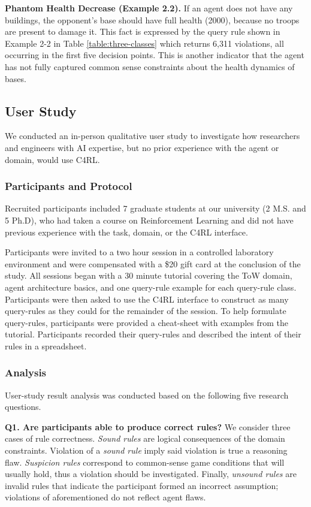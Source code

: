 \documentclass[letterpaper]{article} %
\begin{document}
\textbf{Phantom Health Decrease (Example 2.2).}
If an agent does not have any buildings, the opponent's base should have full health (2000), because no troops are present to damage it. This fact is expressed by the query rule shown in Example 2-2 in Table \ref{table:three-classes} which returns 6,311 violations, all occurring in the first five decision points. This is  another indicator that the agent has not fully captured common sense constraints about the health dynamics of bases. 

\subsection{User Study}
\label{sec:user-study}

We conducted an in-person qualitative user study to investigate how researchers and engineers with AI expertise, but no prior experience with the agent or domain, would use C4RL.

\subsubsection{Participants and Protocol}
Recruited participants included 7 graduate students at our university (2 M.S. and 5 Ph.D), who had taken a course on Reinforcement Learning and did not have previous experience with the task, domain, or the C4RL interface.

Participants were invited to a two hour session in a controlled laboratory environment and were compensated with a \$20 gift card at the conclusion of the study.
All sessions began with a 30 minute tutorial covering the ToW domain, agent architecture basics, and one query-rule example for each query-rule class. 
Participants were then asked to use the C4RL interface to construct as many query-rules as they could for the remainder of the session.
To help formulate query-rules, participants were provided a cheat-sheet with examples from the tutorial.
Participants recorded their query-rules and described the intent of their rules in a spreadsheet.

\subsubsection{Analysis} User-study result analysis was conducted based on the following five research questions.

\textbf{Q1. Are participants able to produce correct rules?}
We consider three cases of rule correctness. \emph{Sound rules} are logical consequences of the domain constraints. Violation of a \emph{sound rule} imply said violation is true a reasoning flaw. \emph{Suspicion rules} correspond to common-sense game conditions that will usually hold, thus a violation should be investigated. Finally, \emph{unsound rules} are invalid rules that indicate the participant formed an incorrect assumption; violations of aforementioned do not reflect agent flaws.
\end{document}
